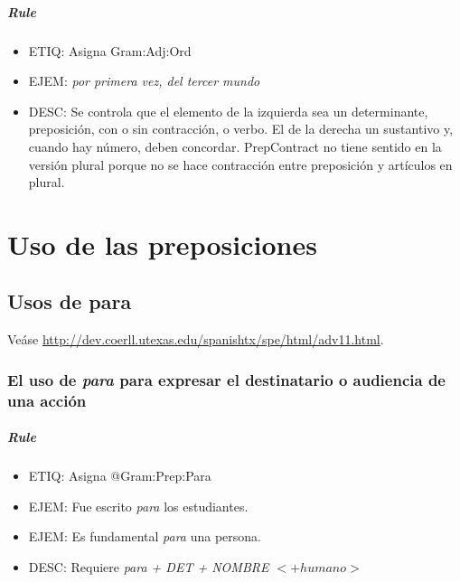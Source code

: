 \documentclass[11pt]{report}
\begin{document}
\paragraph*{Rule}
\begin{itemize}
\item ETIQ: Asigna Gram:Adj:Ord
\item EJEM: \emph{por primera vez, del tercer mundo} 
\item DESC: Se controla que el elemento de la izquierda sea un determinante, preposición, con o sin contracción, o verbo. El de la derecha un sustantivo y, cuando hay número, deben concordar. PrepContract no tiene sentido en la versión plural porque no se hace contracción entre preposición y artículos en plural.
\end{itemize}

\chapter{Uso de las preposiciones}
\section{Usos de para}
Veáse \url{http://dev.coerll.utexas.edu/spanishtx/spe/html/adv11.html}.

\subsection{El uso de \emph{para} para expresar el destinatario o audiencia de una acción}
\paragraph*{Rule}
\begin{itemize}
\item ETIQ: Asigna @Gram:Prep:Para
\item EJEM: Fue escrito \emph{para} los estudiantes.
\item EJEM: Es fundamental \emph{para} una persona.
\item DESC: Requiere \emph{para + DET + NOMBRE $<+humano>$}
\end{itemize}
\end{document}
